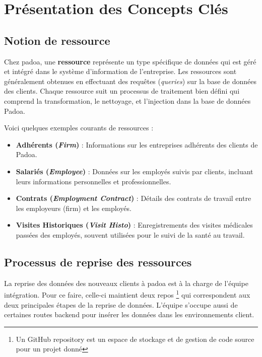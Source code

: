 \section{Présentation des Concepts Clés}

\subsection{Notion de ressource}

Chez padoa, une \textbf{ressource} représente un type spécifique de données qui est géré et intégré dans le système d'information de l'entreprise. Les ressources sont généralement obtenues en effectuant des requêtes (\emph{queries}) sur la base de données des clients. Chaque ressource suit un processus de traitement bien défini qui comprend la transformation, le nettoyage, et l'injection dans la base de données Padoa.

Voici quelques exemples courants de ressources :

\begin{itemize}
    \item \textbf{Adhérents (\emph{Firm})} : Informations sur les entreprises adhérents des clients de Padoa.
    \item \textbf{Salariés (\emph{Employee})} : Données sur les employés suivis par clients, incluant leurs informations personnelles et professionnelles.
    \item \textbf{Contrats (\emph{Employment Contract})} : Détails des contrats de travail entre les employeurs (firm) et les employés.
    \item \textbf{Visites Historiques (\emph{Visit Histo})} : Enregistrements des visites médicales passées des employés, souvent utilisées pour le suivi de la santé au travail.
\end{itemize}

\subsection{Processus de reprise des ressources}

La reprise des données des nouveaux clients à padoa est à la charge de l'équipe intégration. Pour ce faire, celle-ci maintient deux repos \footnote{Un GitHub repository est un espace de stockage et de gestion de code source pour un projet donné} qui correspondent aux deux principales
étapes de la reprise de données. L'équipe s'occupe aussi de certaines routes backend pour insérer les données dans les environnements client.

